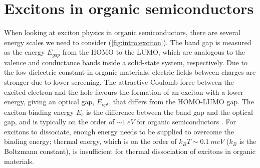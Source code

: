 



\section{Excitons in organic semiconductors}

When looking at exciton physics in organic semiconductors, there are several energy scales we need to consider (\autoref{fig:intro:exciton}). The band gap is measured as the energy $E_{gap}$ from the \ac{HOMO} to the \ac{LUMO}, which are analogous to the valence and conductance bands inside a solid-state system, respectively.  Due to the low dielectric constant in organic materials, electric fields between charges are stronger due to lower screening. The attractive Coulomb force between the excited electron and the hole favours the formation of an exciton with a lower energy, giving an optical gap, $E_{opt}$, that differs from the HOMO-LUMO gap. The exciton binding energy $E_b$ is the difference between the band gap and the optical gap, and is typically on the order of $\sim \SI{1}{eV}$ for organic semiconductors \citep{knupfer2003exciton}. For excitons to dissociate, enough energy needs to be supplied to overcome the binding energy; thermal energy, which is on the order of $k_B T \sim \SI{0.1}{meV}$ ($k_B$ is the Boltzmann constant), is insufficient for thermal dissociation of excitons in organic materials.



